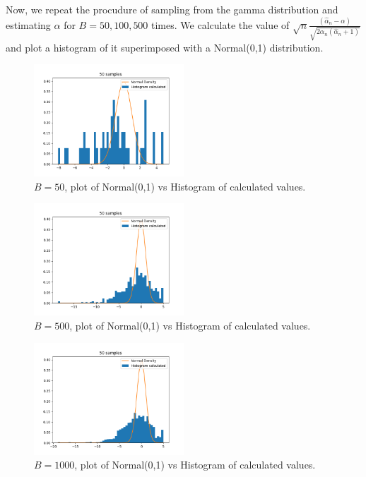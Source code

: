\documentclass[11pt]{article}
\begin{document}
\noindent Now, we repeat the procudure of sampling from the gamma distribution and estimating $\alpha$ for $B = 50, 100, 500$ times. We calculate the value of $\sqrt{n}\frac{(\hat{\alpha}_{n} - \alpha)}{\sqrt{2 \hat{\alpha}_{n}(\hat{\alpha}_{n} + 1)}}$ and plot a histogram of it superimposed with a Normal(0,1) distribution.
\begin{figure}[H]
  \centering
  \includegraphics[width = 0.5\textwidth]{5.2.png}
  \caption{$B = 50$, plot of Normal(0,1) vs Histogram of calculated values.}
\end{figure}
\begin{figure}[H]
  \centering
  \includegraphics[width = 0.5\textwidth]{5.3.png}
  \caption{$B = 500$, plot of Normal(0,1) vs Histogram of calculated values.}
\end{figure}
\begin{figure}[H]
  \centering
  \includegraphics[width = 0.5\textwidth]{5.4.png}
  \caption{$B = 1000$, plot of Normal(0,1) vs Histogram of calculated values.}
\end{figure}
\end{document}
